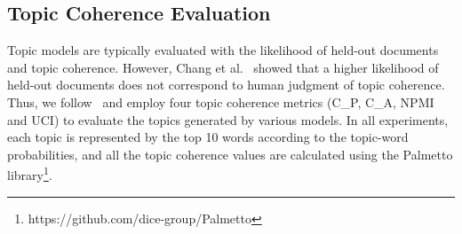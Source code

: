 \documentclass[11pt,a4paper]{article}
\begin{document}
\subsection{Topic Coherence Evaluation}

Topic models are typically evaluated with the likelihood of held-out documents and topic coherence. However, Chang et al.~ showed that a higher likelihood of held-out documents does not correspond to human judgment of topic coherence. Thus, we follow~\cite{roder2015exploring} and employ four topic coherence metrics (C\_P, C\_A, NPMI and UCI) to evaluate the topics generated by various models.
In all experiments, each topic is represented by the top 10 words according to the topic-word probabilities, and all the topic coherence values are calculated using the Palmetto library\footnote{https://github.com/dice-group/Palmetto}.
\end{document}
